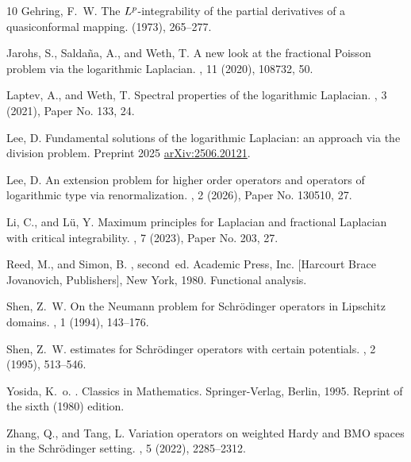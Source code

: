 \documentclass[10pt, a4paper, reqno]{amsart}
\theoremstyle{definition}
\theoremstyle{remark}
\numberwithin{equation}{section}
\begin{document}
\begin{thebibliography}{10}
{\sc Gehring, F.~W.}
\newblock The {$L\sp{p}$}-integrability of the partial derivatives of a quasiconformal mapping.
 (1973), 265--277.

{\sc Jarohs, S., Salda\~na, A., and Weth, T.}
\newblock A new look at the fractional {P}oisson problem via the logarithmic {L}aplacian.
, 11 (2020), 108732, 50.

{\sc Laptev, A., and Weth, T.}
\newblock Spectral properties of the logarithmic {L}aplacian.
, 3 (2021), Paper No. 133, 24.

{\sc Lee, D.}
\newblock Fundamental solutions of the logarithmic {L}aplacian: an approach via the division problem.
\newblock Preprint 2025 \href{https://arxiv.org/abs/2506.20121}{arXiv:2506.20121}.

{\sc Lee, D.}
\newblock An extension problem for higher order operators and operators of logarithmic type via renormalization.
, 2 (2026), Paper No. 130510, 27.

{\sc Li, C., and L\"u, Y.}
\newblock Maximum principles for {L}aplacian and fractional {L}aplacian with critical integrability.
, 7 (2023), Paper No. 203, 27.

{\sc Reed, M., and Simon, B.}
, second~ed.
\newblock Academic Press, Inc. [Harcourt Brace Jovanovich, Publishers], New York, 1980.
\newblock Functional analysis.

{\sc Shen, Z.~W.}
\newblock On the {N}eumann problem for {S}chr\"odinger operators in {L}ipschitz domains.
, 1 (1994), 143--176.

{\sc Shen, Z.~W.}
 estimates for {S}chr\"odinger operators with certain potentials.
, 2 (1995), 513--546.

{\sc Yosida, K.~o.}
.
\newblock Classics in Mathematics. Springer-Verlag, Berlin, 1995.
\newblock Reprint of the sixth (1980) edition.

{\sc Zhang, Q., and Tang, L.}
\newblock Variation operators on weighted {H}ardy and {BMO} spaces in the {S}chr\"odinger setting.
, 5 (2022), 2285--2312.

\end{thebibliography}
\end{document}

